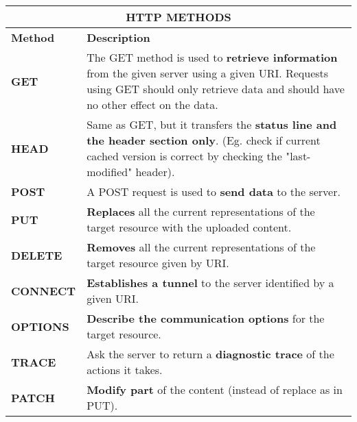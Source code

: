 \documentclass[../main.tex]{subfiles}
\begin{document}
    \begin{table}[H]
        \begin{center}
            \begin{tabular}{|p{3cm}|p{13.5cm}|}
                \hline
                \multicolumn{2}{|c|}{\textbf{HTTP METHODS}}\\
                \hline
                \textbf{Method} & \textbf{Description}\\
                \hline
                \hline
                \textbf{GET} & The GET method is used to \textbf{retrieve information} from the given server using a
                given URI. Requests using GET should only retrieve data and should have no other effect on the data.\\
                \hline
                \textbf{HEAD} & Same as GET, but it transfers the \textbf{status line and the header section only}.
                (Eg. check if current cached version is correct by checking the "last-modified" header).\\
                \hline
                \textbf{POST} & A POST request is used to \textbf{send data} to the server.\\
                \hline
                \textbf{PUT} & \textbf{Replaces} all the current representations of the target resource with the
                uploaded content.\\
                \hline
                \textbf{DELETE} & \textbf{Removes} all the current representations of the target resource given by URI.\\
                \hline
                \textbf{CONNECT} & \textbf{Establishes a tunnel} to the server identified by a given URI.\\
                \hline
                \textbf{OPTIONS} & \textbf{Describe the communication options} for the target resource.\\
                \hline
                \textbf{TRACE} & Ask the server to return a \textbf{diagnostic trace} of the actions it takes.\\
                \hline
                \textbf{PATCH} & \textbf{Modify part} of the content (instead of replace as in PUT).\\
                \hline
            \end{tabular}
        \end{center}
    \end{table}
\end{document}
